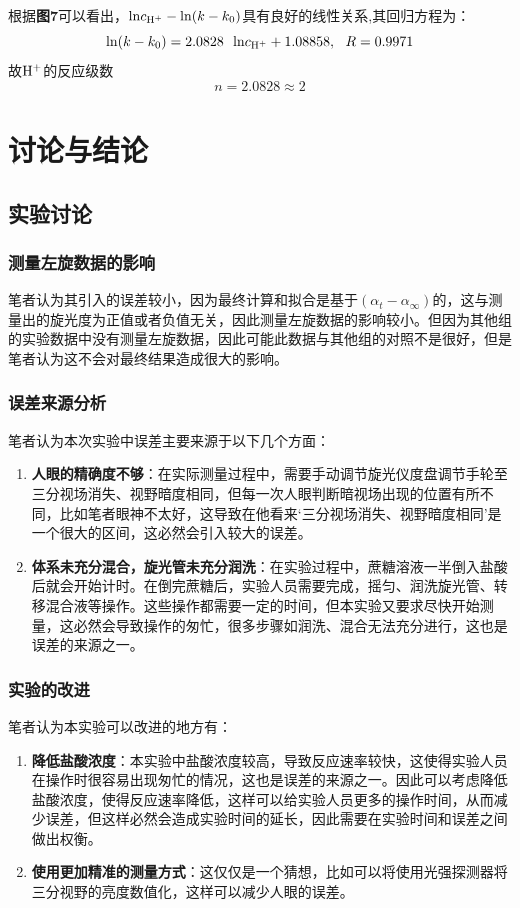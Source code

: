 \documentclass[12pt]{article}
\begin{document}
					\par
					根据\textbf{图7}可以看出，${\rm ln}c_{\rm H^{+}}-{\rm ln}(k-k_{0})$具有良好的线性关系,其回归方程为：
					$$
					{\rm ln}(k-k_{0})=2.0828\ \ {\rm ln}c_{\rm H^{+}}+1.08858,\ \ R=0.9971
					$$
					故$\rm H^{+}$的反应级数
					$$
					n=2.0828\approx2
					$$

					\section{讨论与结论}
					\subsection{实验讨论}
					\subsubsection{测量左旋数据的影响}
					笔者认为其引入的误差较小，因为最终计算和拟合是基于$(\alpha_{t}-\alpha_{\infty})$的，这与测量出的旋光度为正值或者负值无关，因此测量左旋数据的影响较小。但因为其他组的实验数据中没有测量左旋数据，因此可能此数据与其他组的对照不是很好，但是笔者认为这不会对最终结果造成很大的影响。
					\subsubsection{误差来源分析}
					笔者认为本次实验中误差主要来源于以下几个方面：
					\begin{enumerate}
						\item \textbf{人眼的精确度不够}：在实际测量过程中，需要手动调节旋光仪度盘调节手轮至三分视场消失、视野暗度相同，但每一次人眼判断暗视场出现的位置有所不同，比如笔者眼神不太好，这导致在他看来‘三分视场消失、视野暗度相同’是一个很大的区间，这必然会引入较大的误差。\par
						\item \textbf{体系未充分混合，旋光管未充分润洗}：在实验过程中，蔗糖溶液一半倒入盐酸后就会开始计时。在倒完蔗糖后，实验人员需要完成，摇匀、润洗旋光管、转移混合液等操作。这些操作都需要一定的时间，但本实验又要求尽快开始测量，这必然会导致操作的匆忙，很多步骤如润洗、混合无法充分进行，这也是误差的来源之一。\par
					\end{enumerate}
					\subsubsection{实验的改进}
					笔者认为本实验可以改进的地方有：
					\begin{enumerate}
						\item \textbf{降低盐酸浓度}：本实验中盐酸浓度较高，导致反应速率较快，这使得实验人员在操作时很容易出现匆忙的情况，这也是误差的来源之一。因此可以考虑降低盐酸浓度，使得反应速率降低，这样可以给实验人员更多的操作时间，从而减少误差，但这样必然会造成实验时间的延长，因此需要在实验时间和误差之间做出权衡。\par
						\item \textbf{使用更加精准的测量方式}：这仅仅是一个猜想，比如可以将使用光强探测器将三分视野的亮度数值化，这样可以减少人眼的误差。\par
					\end{enumerate}
\end{document}
